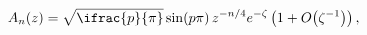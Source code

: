 \[\mathop{A_{n}\/}\nolimits\!\left(z\right)=\sqrt{\ifrac{p}{\pi}}\mathop{\sin\/}%
\nolimits\!\left(p\pi\right)z^{-n/4}e^{-\zeta}\left(1+\mathop{O\/}\nolimits\!%
\left(\zeta^{-1}\right)\right),\]